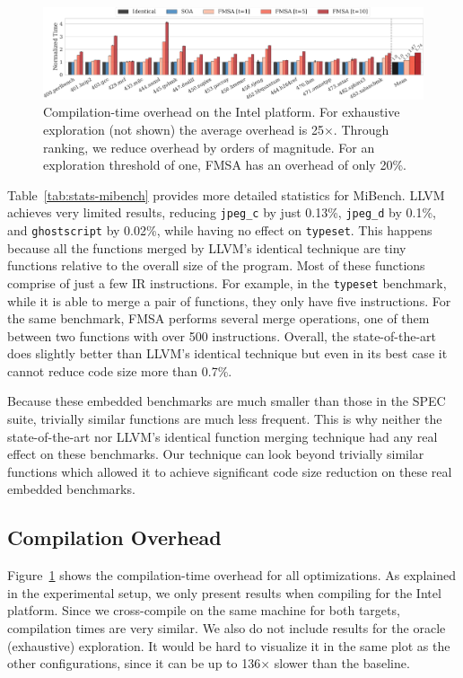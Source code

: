 \begin{figure}[t]
  \centering
  \includegraphics[width=\linewidth]{figs/compilation-time.pdf}
	\caption{Compilation-time overhead on the Intel platform. For exhaustive exploration (not shown) the average overhead is 25$\times$. Through ranking, we reduce overhead by orders of magnitude. For an exploration threshold of one, FMSA has an overhead of only 20\%.}
  \label{fig:compilation-time}
\end{figure}

Table~\ref{tab:stats-mibench} provides more detailed statistics for MiBench.
LLVM achieves very limited results, reducing \texttt{jpeg\_c} by just 0.13\%,
\texttt{jpeg\_d} by 0.1\%, and \texttt{ghostscript} by 0.02\%, while having no effect on \texttt{typeset}.
This happens because all the functions merged by LLVM's identical technique are tiny functions relative to the overall size of the program.
Most of these functions comprise of just a few IR instructions. For example, in the \texttt{typeset} benchmark,
while it is able to merge a pair of functions, they only have five instructions. For the same benchmark, FMSA performs several merge operations, one of them between two functions with over 500 instructions.
Overall, the state-of-the-art does slightly better than LLVM's identical technique but even in its best case it cannot reduce code size more than 0.7\%.

Because these embedded benchmarks are much smaller than those in the SPEC suite, trivially similar functions are much less frequent.
This is why neither the state-of-the-art nor LLVM's identical function merging technique had any real effect on these benchmarks.
Our technique can look beyond trivially similar functions which allowed it to achieve significant code size reduction on these real embedded benchmarks.

\subsection{Compilation Overhead}

Figure~\ref{fig:compilation-time} shows the compilation-time overhead for all optimizations. As explained in the experimental setup, we
only present results when compiling for the Intel platform. Since we cross-compile on the same machine for both targets, compilation times
are very similar. We also do not include results for the oracle (exhaustive) exploration. It would be hard to visualize it in the same plot
as the other configurations, since it can be up to 136$\times$ slower than the baseline.

